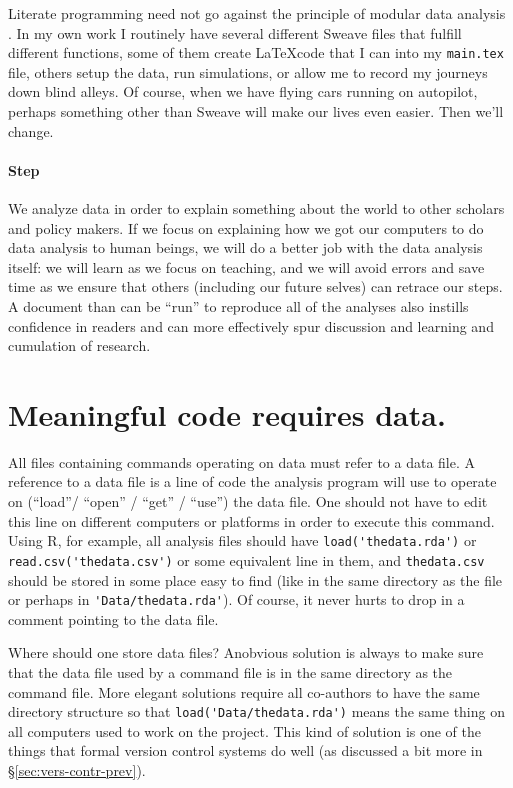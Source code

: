 \documentclass[12pt]{article}
\begin{document}
Literate programming need not go against the principle of modular data
analysis \citep{nagler1995coding}. In my own work I routinely have
several different Sweave files that fulfill different functions, some
of them create \LaTeX code that I can \Verb++ into my
\Verb+main.tex+ file, others setup the data, run simulations, or allow
me to record my journeys down blind alleys. Of course, when we have
flying cars running on autopilot, perhaps something other than
Sweave will make our lives even easier. Then we'll change.

\paragraph{Step \thesection}

We analyze data in order to explain something about the world to other
scholars and policy makers. If we focus on explaining how we got our
computers to do data analysis to human beings, we will do a better job
with the data analysis itself: we will learn as we focus on teaching,
and we will avoid errors and save time as we ensure that others
(including our future selves) can retrace our steps. A document than
can be ``run'' to reproduce all of the analyses also instills
confidence in readers and can more effectively spur discussion and
learning and cumulation of research.

\section{Meaningful code requires data.}

All files containing commands operating on data must refer to a data
file. A reference to a data file is a line of code the analysis
program will use to operate on (``load''/ ``open'' / ``get'' /
``use'') the data file. One should not have to edit this line on
different computers or platforms in order to execute this command.
Using R, for example, all analysis files should have
\Verb+load('thedata.rda')+ or \Verb+read.csv('thedata.csv')+ or some
equivalent line in them, and \Verb+thedata.csv+ should be stored in
some place easy to find (like in the same directory as the file or
perhaps in \Verb+'Data/thedata.rda'+). Of course, it never hurts to
drop in a comment pointing to the data file.

Where should one store data files? Anobvious solution is always to
make sure that the data file used by a command file is in the same
directory as the command file. More elegant solutions require all
co-authors to have the same directory structure so that
\Verb+load('Data/thedata.rda')+ means the same thing on all computers
used to work on the project. This kind of solution is one of the
things that formal version control systems do well (as discussed
a bit more in \S\ref{sec:vers-contr-prev}).
\end{document}
